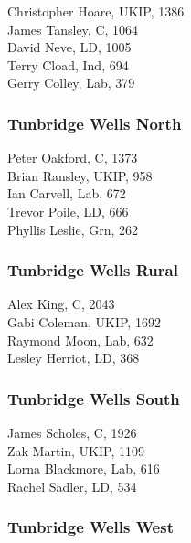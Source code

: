 \documentclass[a4paper,openany,10pt]{book}
\begin{document}


Christopher Hoare, UKIP, 1386\\
James Tansley, C, 1064\\
David Neve, LD, 1005\\
Terry Cload, Ind, 694\\
Gerry Colley, Lab, 379\\


\subsubsection*{Tunbridge Wells North}



Peter Oakford, C, 1373\\
Brian Ransley, UKIP, 958\\
Ian Carvell, Lab, 672\\
Trevor Poile, LD, 666\\
Phyllis Leslie, Grn, 262\\


\subsubsection*{Tunbridge Wells Rural}



Alex King, C, 2043\\
Gabi Coleman, UKIP, 1692\\
Raymond Moon, Lab, 632\\
Lesley Herriot, LD, 368\\


\subsubsection*{Tunbridge Wells South}



James Scholes, C, 1926\\
Zak Martin, UKIP, 1109\\
Lorna Blackmore, Lab, 616\\
Rachel Sadler, LD, 534\\


\subsubsection*{Tunbridge Wells West}
\end{document}

